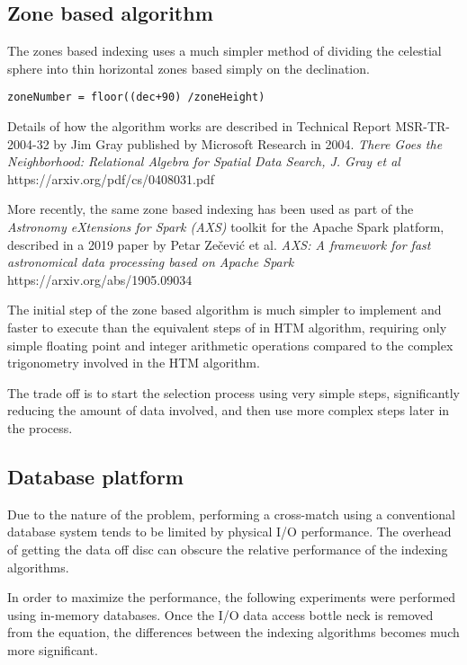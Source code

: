 \documentclass{article}
\newcommand{\apachespark} {Apache Spark\xspace}
\newcommand{\crossmatch} {cross-match\xspace}
\begin{document}
\subsection{Zone based algorithm}
\label{crossmatch-zones}

The zones based indexing uses a much simpler method of dividing the celestial sphere into thin horizontal zones based simply on the declination.

\begin{lstlisting}[]
zoneNumber = floor((dec+90) /zoneHeight)
\end{lstlisting}

Details of how the algorithm works are described in Technical Report MSR-TR-2004-32 by Jim Gray published by Microsoft Research in 2004.
\textit{There Goes the Neighborhood: Relational Algebra for Spatial Data Search, J. Gray et al}
https://arxiv.org/pdf/cs/0408031.pdf

More recently, the same zone based indexing has been used as part of the \textit{Astronomy eXtensions for Spark (AXS)} toolkit for the \apachespark platform, described in a 2019 paper by Petar Zečević et al.
\textit{AXS: A framework for fast astronomical data processing based on Apache Spark}
https://arxiv.org/abs/1905.09034

The initial step of the zone based algorithm is much simpler to implement and faster to execute than the equivalent steps of in HTM algorithm, requiring only simple floating point and integer arithmetic operations compared to the complex trigonometry involved in the HTM algorithm.

The trade off is to start the selection process using very simple steps, significantly reducing the amount of data involved, and then use more complex steps later in the process.

\subsection{Database platform}
\label{database-platform}

Due to the nature of the problem, performing a \crossmatch using a conventional database system tends to be limited by physical I/O performance. The overhead of getting the data off disc can obscure the relative performance of the indexing algorithms.

In order to maximize the performance, the following experiments were performed using in-memory databases. Once the I/O data access bottle neck is removed from the equation, the differences between the indexing algorithms becomes much more significant.
\end{document}
